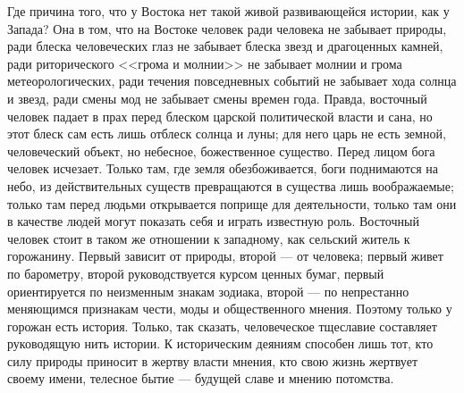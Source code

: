 \documentclass[12pt,oneside]{book}
\begin{document}
Где причина того, что у Востока нет такой живой развивающейся истории, как у Запада? Она в том, что на Востоке человек ради человека не забывает природы, ради блеска человеческих глаз не забывает блеска звезд и драгоценных камней, ради риторического <<грома и молнии>> не забывает молнии и грома метеорологических, ради течения повседневных событий не забывает хода солнца и звезд, ради смены мод не забывает смены времен года. Правда, восточный человек падает в прах перед блеском царской политической власти и сана, но этот блеск сам есть лишь отблеск солнца и луны; для него царь не есть земной, человеческий объект, но небесное, божественное существо. Перед лицом бога человек исчезает. Только там, где земля обезбоживается, боги поднимаются на небо, из действительных существ превращаются в существа лишь воображаемые; только там перед людьми открывается поприще для деятельности, только там они в качестве людей могут показать себя и играть известную роль. Восточный человек стоит в таком же отношении к западному, как сельский житель к горожанину. Первый зависит от природы, второй --- от человека; первый живет по барометру, второй руководствуется курсом ценных бумаг, первый ориентируется по неизменным знакам зодиака, второй --- по непрестанно меняющимся признакам чести, моды и общественного мнения. Поэтому только у горожан есть история. Только, так сказать, человеческое тщеславие составляет руководящую нить истории. К историческим деяниям способен лишь тот, кто силу природы приносит в жертву власти мнения, кто свою жизнь жертвует своему имени, телесное бытие --- будущей славе и мнению потомства.


\chapter{}
\end{document}
